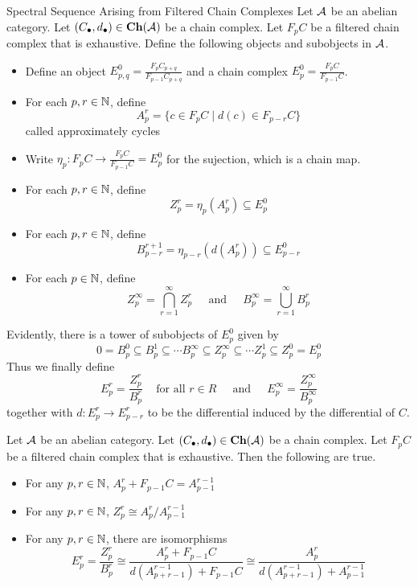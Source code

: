 \documentclass[a4paper]{article}
\begin{document}
\begin{defn}{Spectral Sequence Arising from Filtered Chain Complexes}{} Let $\mathcal{A}$ be an abelian category. Let $(C_\bullet,d_\bullet)\in\bold{Ch}(\mathcal{A})$ be a chain complex. Let $F_pC$ be a filtered chain complex that is exhaustive. Define the following objects and subobjects in $\mathcal{A}$. 
\begin{itemize}
\item Define an object $E_{p,q}^0=\frac{F_pC_{p+q}}{F_{p-1}C_{p+q}}$ and a chain complex $E_p^0=\frac{F_pC}{F_{p-1}C}$. 
\item For each $p,r\in\mathbb{N}$, define $$A_p^r=\{c\in F_pC\;|\;d(c)\in F_{p-r}C\}$$ called approximately cycles
\item Write $\eta_p:F_pC\to\frac{F_pC}{F_{p-1}C}=E_p^0$ for the sujection, which is a chain map. 
\item For each $p,r\in\mathbb{N}$, define $$Z_p^r=\eta_p(A_p^r)\subseteq E_p^0$$
\item For each $p,r\in\mathbb{N}$, define $$B_{p-r}^{r+1}=\eta_{p-r}(d(A_p^r))\subseteq E_{p-r}^0$$
\item For each $p\in\mathbb{N}$, define $$Z_p^\infty=\bigcap_{r=1}^\infty Z_p^r\;\;\;\;\text{ and }\;\;\;\; B_p^\infty=\bigcup_{r=1}^\infty B_p^r$$
\end{itemize}
Evidently, there is a tower of subobjects of $E_p^0$ given by $$0=B_p^0\subseteq B_p^1\subseteq\cdots B_p^\infty\subseteq Z_p^\infty\subseteq\cdots Z_p^1\subseteq Z_p^0=E_p^0$$ Thus we finally define $$E_p^r=\frac{Z_p^r}{B_p^r}\;\;\;\text{ for all }r\in R\;\;\;\;\text{ and }\;\;\;\;E_p^\infty=\frac{Z_p^\infty}{B_p^\infty}$$ together with $d:E_p^r\to E_{p-r}^r$ to be the differential induced by the differential of $C$. 
\end{defn}

\begin{lmm}{}{} Let $\mathcal{A}$ be an abelian category. Let $(C_\bullet,d_\bullet)\in\bold{Ch}(\mathcal{A})$ be a chain complex. Let $F_pC$ be a filtered chain complex that is exhaustive. Then the following are true. 
\begin{itemize}
\item For any $p,r\in\mathbb{N}$, $A_p^r+F_{p-1}C=A_{p-1}^{r-1}$
\item For any $p,r\in\mathbb{N}$, $Z_p^r\cong A_p^r/A_{p-1}^{r-1}$
\item For any $p,r\in\mathbb{N}$, there are isomorphisms $$E_p^r=\frac{Z_p^r}{B_p^r}\cong\frac{A_p^r+F_{p-1}C}{d(A_{p+r-1}^{r-1})+F_{p-1}C}\cong\frac{A_p^r}{d(A_{p+r-1}^{r-1})+A_{p-1}^{r-1}}$$
\end{itemize}
\end{lmm}
\end{document}
